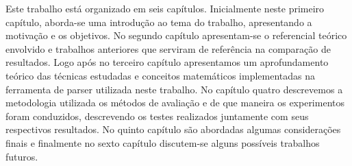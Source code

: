 Este trabalho está organizado em seis capítulos. Inicialmente neste primeiro capítulo, aborda-se uma introdução ao tema do trabalho, apresentando a motivação e os objetivos. No segundo capítulo apresentam-se o referencial teórico envolvido e trabalhos anteriores que serviram de referência na comparação de resultados. Logo após no terceiro capítulo apresentamos um aprofundamento teórico das técnicas estudadas e conceitos matemáticos implementadas na ferramenta de parser utilizada neste trabalho. No capítulo quatro descrevemos a metodologia utilizada os métodos de avaliação e de que maneira os experimentos foram conduzidos, descrevendo os testes realizados juntamente com seus respectivos resultados. No quinto capítulo são abordadas algumas considerações finais e finalmente no sexto capítulo discutem-se alguns possíveis trabalhos futuros.
